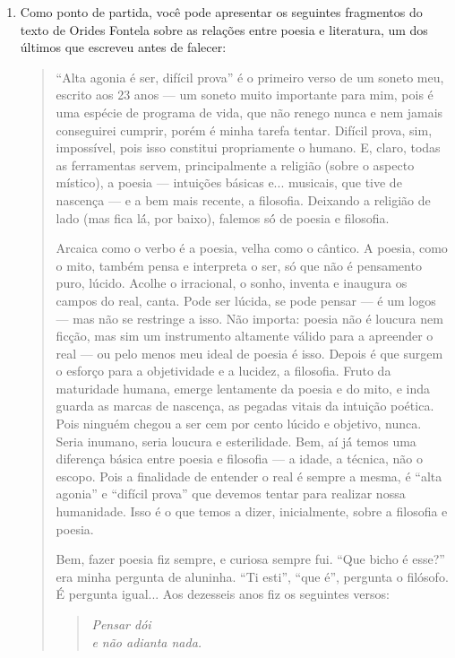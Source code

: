 \documentclass[12pt]{extarticle}
\begin{document}
\begin{enumerate}
\item Como ponto de partida, você pode apresentar os
seguintes fragmentos do texto de Orides Fontela sobre as relações entre
poesia e literatura, um dos últimos que escreveu antes de falecer:

\begin{quote}
``Alta agonia é ser, difícil prova'' é o primeiro verso de um soneto
meu, escrito aos 23 anos --- um soneto muito importante para mim, pois é
uma espécie de programa de vida, que não renego nunca e nem jamais
conseguirei cumprir, porém é minha tarefa tentar. Difícil prova, sim,
impossível, pois isso constitui propriamente o humano. E, claro, todas
as ferramentas servem, principalmente a religião (sobre o aspecto
místico), a poesia --- intuições básicas e... musicais, que tive de
nascença --- e a bem mais recente, a filosofia. Deixando a religião de
lado (mas fica lá́, por baixo), falemos só́ de poesia e filosofia.

Arcaica como o verbo é a poesia, velha como o cântico. A poesia, como o
mito, também pensa e interpreta o ser, só que não é pensamento puro,
lúcido. Acolhe o irracional, o sonho, inventa e inaugura os campos do
real, canta. Pode ser lúcida, se pode pensar --- é um logos --- mas não
se restringe a isso. Não importa: poesia não é loucura nem ficção, mas
sim um instrumento altamente válido para a apreender o real --- ou pelo
menos meu ideal de poesia é isso. Depois é que surgem o esforço para a
objetividade e a lucidez, a filosofia. Fruto da maturidade humana,
emerge lentamente da poesia e do mito, e inda guarda as marcas de
nascença, as pegadas vitais da intuição poética. Pois ninguém chegou
a ser cem por cento lúcido e objetivo, nunca. Seria inumano, seria
loucura e esterilidade. Bem, aí já́ temos uma diferença básica entre
poesia e filosofia --- a idade, a técnica, não o escopo. Pois a
finalidade de entender o real é sempre a mesma, é ``alta agonia'' e
``difícil prova'' que devemos tentar para realizar nossa humanidade.
Isso é o que temos a dizer, inicialmente, sobre a filosofia e poesia.

Bem, fazer poesia fiz sempre, e curiosa sempre fui. ``Que bicho é
esse?'' era minha pergunta de aluninha. ``Ti esti'', ``que é'', pergunta
o filósofo. É pergunta igual... Aos dezesseis anos fiz os seguintes
versos:


\begin{verse}
\hspace{3cm}\emph{Pensar dói}\\
\hspace{3cm}\emph{e não adianta nada.}
\end{verse}


\end{quote}
\end{enumerate}
\end{document}
